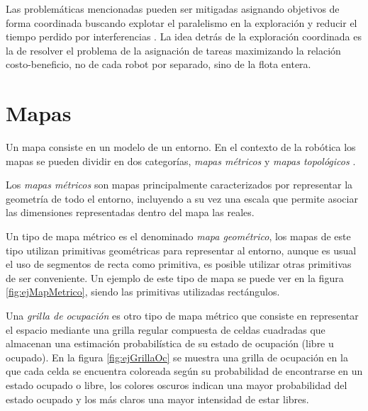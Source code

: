 Las problemáticas mencionadas pueden ser mitigadas asignando objetivos de forma
coordinada buscando explotar el paralelismo en la exploración y reducir el
tiempo perdido por interferencias \cite{nieto2014coordination}. La idea detrás
de la exploración coordinada es la de resolver el problema de la asignación de
tareas maximizando la relación costo-beneficio, no de cada robot por separado,
sino de la flota entera.




\section{Mapas}\label{subsec:mapas} %
Un mapa consiste en un modelo de un entorno. En el contexto de la robótica los mapas se pueden dividir en dos categorías, \emph{mapas métricos} y \emph{mapas topológicos} \cite{Thrun1998,choset2005principles}.

Los \emph{mapas métricos} son mapas principalmente caracterizados por representar la geometría de todo el entorno, incluyendo a su vez una escala que permite asociar las dimensiones representadas dentro del mapa las reales.

Un tipo de mapa métrico es el denominado \emph{mapa geométrico}, los mapas de este tipo utilizan primitivas geométricas para representar al entorno, aunque es usual el uso de segmentos de recta como primitiva, es posible utilizar otras primitivas de ser conveniente. Un ejemplo de este tipo de mapa se puede ver en la figura \ref{fig:ejMapMetrico}, siendo las primitivas utilizadas rectángulos.

Una \emph{grilla de ocupación} es otro tipo de mapa métrico que consiste en representar el espacio mediante una grilla regular compuesta de celdas cuadradas que almacenan una estimación probabilística de su estado de ocupación (libre u ocupado). En la figura \ref{fig:ejGrillaOc} se muestra una grilla de ocupación en la que cada celda se encuentra coloreada según su probabilidad de encontrarse en un estado ocupado o libre, los colores oscuros indican una mayor probabilidad del estado ocupado y los más claros una mayor intensidad de estar libres.

